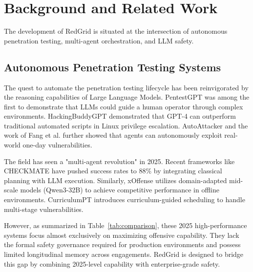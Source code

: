\documentclass[conference,compsoc]{IEEEtran}
\begin{document}
\section{Background and Related Work} \label{sec:related}
The development of RedGrid is situated at the intersection of autonomous penetration testing, multi-agent orchestration, and LLM safety.

\subsection{Autonomous Penetration Testing Systems}
The quest to automate the penetration testing lifecycle has been reinvigorated by the reasoning capabilities of Large Language Models. PentestGPT \cite{pentestgpt} was among the first to demonstrate that LLMs could guide a human operator through complex environments. HackingBuddyGPT \cite{hackingbuddygpt} demonstrated that GPT-4 can outperform traditional automated scripts in Linux privilege escalation. AutoAttacker \cite{autoattacker} and the work of Fang et al. \cite{fang2024} further showed that agents can autonomously exploit real-world one-day vulnerabilities.

The field has seen a "multi-agent revolution" in 2025. Recent frameworks like CHECKMATE \cite{checkmate2025} have pushed success rates to 88\% by integrating classical planning with LLM execution. Similarly, xOffense \cite{xoffense2025} utilizes domain-adapted mid-scale models (Qwen3-32B) to achieve competitive performance in offline environments. CurriculumPT \cite{curriculumpt2025} introduces curriculum-guided scheduling to handle multi-stage vulnerabilities.

However, as summarized in Table~\ref{tab:comparison}, these 2025 high-performance systems focus almost exclusively on maximizing offensive capability. They lack the formal safety governance required for production environments and possess limited longitudinal memory across engagements. RedGrid is designed to bridge this gap by combining 2025-level capability with enterprise-grade safety.
\end{document}
